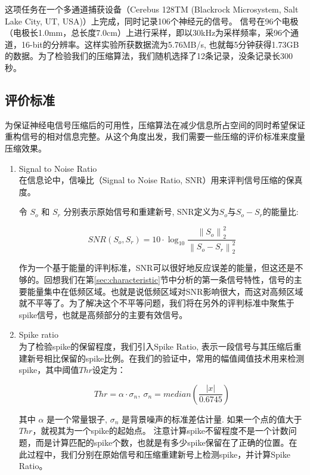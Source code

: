 这项任务在一个多通道捕获设备（Cerebus 128TM (Blackrock Microsystem, Salt Lake City, UT, USA)）上完成，同时记录106个神经元的信号。 信号在96个电极（电极长1.0mm，总长度7.0cm）上进行采样，即以30kHz为采样频率，采96个通道，16-bit的分辨率。这样实验所获数据流为5.76MB/s, 也就每5分钟获得1.73GB的数据。为了检验我们的压缩算法，我们随机选择了12条记录，没条记录长300秒。




\subsection{评价标准}
为保证神经电信号压缩后的可用性，压缩算法在减少信息所占空间的同时希望保证重构信号的相对信息完整\cite{24}。从这个角度出发，我们需要一些压缩的评价标准来度量压缩效果。

\begin{enumerate}
\item{Signal to Noise Ratio}\\
在信息论中，信噪比（Signal to Noise Ratio, SNR）用来评判信号压缩的保真度。

令 $S_o$ 和 $S_r$ 分别表示原始信号和重建新号, SNR定义为$S_o$与$S_o-S_r$的能量比:


\begin{equation}\label{Eq:SNR Def}
  SNR(S_o,S_r)=10\cdot \log_{10} \frac{\left\|S_o\right\|_2^2}{\left\|S_o-S_r\right\|_2^2}
\end{equation}

作为一个基于能量的评判标准，SNR可以很好地反应误差的能量，但这还是不够的。回想我们在第\ref{sec:characteristic}节中分析的第一条信号特性，信号的主要能量集中在低频区域。也就是说低频区域对SNR影响很大，而这对高频区域就不平等了。为了解决这个不平等问题，我们将在另外的评判标准中聚焦于spike信号，也就是高频部分的主要有效信号。

\item{Spike ratio}\\
为了检验spike的保留程度，我们引入Spike Ratio, 表示一段信号与其压缩后重建新号相比保留的spike比例。在我们的验证中，常用的幅值阈值技术\cite{34}用来检测spike，其中阈值$Thr$设定为：


\begin{equation}\label{Eq: Spike Detection Threshold}
  Thr=\alpha \cdot \sigma_n,\ \sigma_n=median\left(\frac{|x|}{0.6745}\right)
\end{equation}

其中 $\alpha$ 是一个常量银子, $\sigma_n$ 是背景噪声的标准差估计量. 如果一个点的值大于 $Thr$，就视其为一个spike的起始点。 注意计算spike不留程度不是一个计数问题，而是计算匹配的spike个数，也就是有多少spike保留在了正确的位置。在此过程中，我们分别在原始信号和压缩重建新号上检测spike，并计算Spike Ratio。


\end{enumerate}
